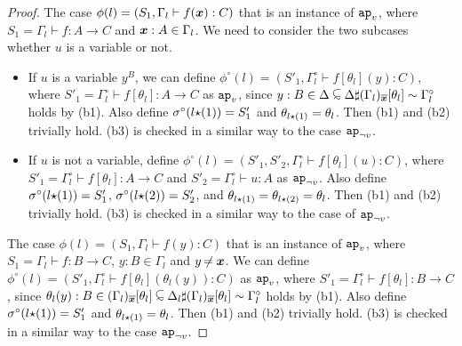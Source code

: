 \begin{proof}
  The case $\phi(l) = (S_1,\Gamma_l\vdash f(\boldsymbol{x}):C)$ that is an instance of $\apvar$, 
  where $S_1 = \Gamma_l \vdash f:A\to C$ and $\boldsymbol{x}:A\in\Gamma_l$. 
  We need to consider the two subcases whether $u$ is a variable or not.
  \begin{itemize}
  \item
    If $u$ is a variable $y^B$, 
    we can define $\phi^\circ(l) = (S'_1, \Gamma^\circ_l\vdash f[\theta_l](y):C)$,
    where $S'_1 = \Gamma^\circ_l\vdash f[\theta_l]:A\to C$ as $\apvar$,
    since
    $y:B \in \Delta \subseteqsim \mergeCtx{\Delta}{\Restrict{(\Gamma_l)}{\overline{\xx}}[\theta_l]} \sim \Gamma^\circ_l$
    holds by (b1). 
    Also define $\sigma^\circ(l{\star}(1)) = S'_1$ and $\theta_{l{\star}(1)} = \theta_l$. 
    Then (b1) and (b2) trivially hold. (b3) is checked in a similar way to the case $\apnotvar$.
  \item
    If $u$ is not a variable, 
    define $\phi^\circ(l) = (S'_1, S'_2, \Gamma^\circ_l\vdash f[\theta_l](u):C)$,
    where
    $S'_1 = \Gamma^\circ_l\vdash f[\theta_l]:A\to C$ and
    $S'_2 = \Gamma^\circ_l\vdash u:A$ as $\apnotvar$. 
    Also define $\sigma^\circ(l{\star}(1)) = S'_1$, $\sigma^\circ(l{\star}(2)) = S'_2$,
    and $\theta_{l{\star}(1)} = \theta_{l{\star}(2)} = \theta_l$. 
    Then (b1) and (b2) trivially hold. (b3) is checked in a similar way to the case of $\apnotvar$. 
  \end{itemize}

  The case $\phi(l) = (S_1,\Gamma_l\vdash f(y):C)$
  that is an instance of $\apvar$, where $S_1 = \Gamma_l \vdash f:B \to C$, $y:B\in\Gamma_l$ and $y\not\nobreak\mkern -2mu = \boldsymbol{x}$. 
  We can define $\phi^\circ(l) = (S'_1, \Gamma^\circ_l\vdash f[\theta_l](\theta_l(y)):C)$ as $\apvar$,
  where $S'_1 = \Gamma^\circ_l\vdash f[\theta_l]:B\to C$, 
  since
  $\theta_l(y):B \in \Restrict{(\Gamma_l)}{\overline{\xx}}[\theta_l] \subseteqsim \mergeCtx{\Delta_l}{\Restrict{(\Gamma_l)}{\overline{\xx}}[\theta_l]} \sim \Gamma^\circ_l$
  holds by (b1). 
  Also define $\sigma^\circ(l{\star}(1)) = S'_1$ and $\theta_{l{\star}(1)} = \theta_l$. 
  Then (b1) and (b2) trivially hold. (b3) is checked in a similar way to the case $\apnotvar$.
  

\end{proof}
